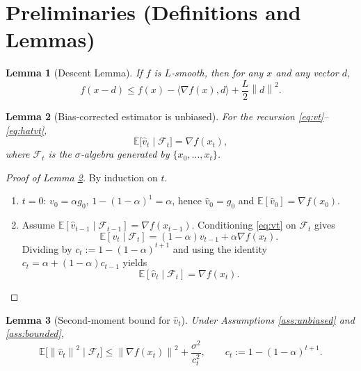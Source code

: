 \documentclass{article}
\newtheorem{lemma}{Lemma}
\newcommand{\E}{\mathbb{E}}
\newcommand{\norm}[1]{\left\lVert#1\right\rVert}
\begin{document}
\section*{Preliminaries (Definitions and Lemmas)}
\begin{lemma}[Descent Lemma]\label{lem:descent}
If $f$ is $L$‑smooth, then for any $x$ and any vector $d$,
\[
f(x-d)\le f(x)-\langle\nabla f(x),d\rangle+\frac{L}{2}\norm{d}^2 .
\]
\end{lemma}
\begin{lemma}[Bias‑corrected estimator is unbiased]\label{lem:unbiased}
For the recursion \eqref{eq:vt}–\eqref{eq:hatvt},
\[
\E\!\big[\hat v_t\mid\mathcal{F}_t\big]=\nabla f(x_t),
\]
where $\mathcal{F}_t$ is the $\sigma$‑algebra generated by $\{x_0,\dots,x_t\}$.
\end{lemma}
\begin{proof}[Proof of Lemma \ref{lem:unbiased}]
By induction on $t$.
\begin{enumerate}
    \item[(Base)] $t=0$: $v_0=\alpha g_0$, $1-(1-\alpha)^{1}=\alpha$, hence $\hat v_0=g_0$ and $\E[\hat v_0]=\nabla f(x_0)$.
    \item[(Induction)] Assume $\E[\hat v_{t-1}\mid\mathcal{F}_{t-1}]=\nabla f(x_{t-1})$. Conditioning \eqref{eq:vt} on $\mathcal{F}_t$ gives
    \[
    \E[v_t\mid\mathcal{F}_t]=(1-\alpha)v_{t-1}+\alpha\nabla f(x_t).
    \]
    Dividing by $c_t:=1-(1-\alpha)^{t+1}$ and using the identity
    $c_t=\alpha+\!(1-\alpha)c_{t-1}$ yields
    \[
    \E[\hat v_t\mid\mathcal{F}_t]=\nabla f(x_t).
    \]
\end{enumerate}
\end{proof}
\begin{lemma}[Second‑moment bound for $\hat v_t$]\label{lem:var}
Under Assumptions \ref{ass:unbiased} and \ref{ass:bounded},
\[
\E\!\big[\norm{\hat v_t}^2\mid\mathcal{F}_t\big]\le
\norm{\nabla f(x_t)}^2+\frac{\sigma^{2}}{c_t^{2}},
\qquad c_t:=1-(1-\alpha)^{t+1}.
\]
\end{lemma}
\end{document}
